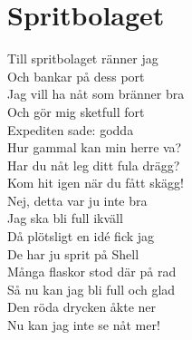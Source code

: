 \section{Spritbolaget}
Till spritbolaget ränner jag\\
Och bankar på dess port\\
Jag vill ha nåt som bränner bra\\
Och gör mig sketfull fort\\
Expediten sade: godda\\
Hur gammal kan min herre va?\\
Har du nåt leg ditt fula drägg?\\
Kom hit igen när du fått skägg!\\

Nej, detta var ju inte bra\\
Jag ska bli full ikväll\\
Då plötsligt en idé fick jag\\
De har ju sprit på Shell\\
Många flaskor stod där på rad\\
Så nu kan jag bli full och glad\\
Den röda drycken åkte ner\\
Nu kan jag inte se nåt mer!\\